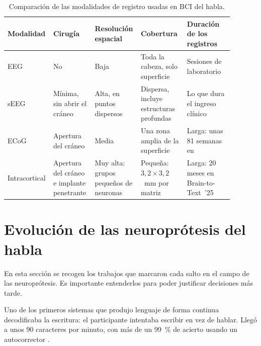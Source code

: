 \begin{table}[htbp]
  \centering
  \caption{Comparación de las modalidades de registro usadas en BCI del habla.}
  \label{tab:sota-modalidades}
  \footnotesize
  \setlength{\tabcolsep}{4pt}
  \renewcommand{\arraystretch}{1.2}
  \begin{tabular}{>{\raggedright\arraybackslash}p{0.14\linewidth}
                  >{\raggedright\arraybackslash}p{0.18\linewidth}
                  >{\raggedright\arraybackslash}p{0.17\linewidth}
                  >{\raggedright\arraybackslash}p{0.2\linewidth}
                  >{\raggedright\arraybackslash}p{0.2\linewidth}}
    \toprule
    \textbf{Modalidad} & \textbf{Cirugía} & \textbf{Resolución espacial} & \textbf{Cobertura} & \textbf{Duración de los registros} \\
    \midrule
    EEG           & No & Baja & Toda la cabeza, solo superficie & Sesiones de laboratorio \\
    sEEG          & Mínima, sin abrir el cráneo \cite{verwoert2022} & Alta, en puntos dispersos & Dispersa, incluye estructuras profundas & Lo que dura el ingreso clínico \\
    ECoG          & Apertura del cráneo \cite{kohler2022} & Media & Una zona amplia de la superficie & Larga: unas 81 semanas en \cite{moses2021} \\
    Intracortical & Apertura del cráneo e implante penetrante & Muy alta: grupos pequeños de neuronas & Pequeña: $3{,}2 \times 3{,}2$~mm por matriz \cite{card2024} & Larga: 20 meses en Brain-to-Text~'25 \cite{b2t25} \\
    \bottomrule
  \end{tabular}
\end{table}

\section{Evolución de las neuroprótesis del habla}
\label{sec:sota-neuroprotesis}

En esta sección se recogen los trabajos que marcaron cada salto en el campo de las neuroprótesis. Es importante entenderlos para poder justificar decisiones más tarde.

Uno de los primeros sistemas que produjo lenguaje de forma continua decodificaba la escritura: el participante intentaba escribir en vez de hablar. Llegó a unos 90 caracteres por minuto, con más de un \SI{99}{\percent} de acierto usando un autocorrector \cite{willett2021}.

